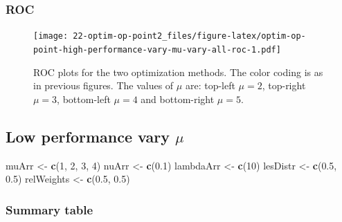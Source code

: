 \documentclass[
]{book}
\newenvironment{Shaded}{\begin{snugshade}}{\end{snugshade}}
\newcommand{\DecValTok}[1]{\textcolor[rgb]{0.00,0.00,0.81}{#1}}
\newcommand{\FloatTok}[1]{\textcolor[rgb]{0.00,0.00,0.81}{#1}}
\newcommand{\KeywordTok}[1]{\textcolor[rgb]{0.13,0.29,0.53}{\textbf{#1}}}
\newcommand{\NormalTok}[1]{#1}
\newcommand{\StringTok}[1]{\textcolor[rgb]{0.31,0.60,0.02}{#1}}
\begin{document}
\hypertarget{roc-5}{%
\subsubsection{ROC}\label{roc-5}}

\begin{figure}
\centering
\texttt{[image: 22-optim-op-point2\_files/figure-latex/optim-op-point-high-performance-vary-mu-vary-all-roc-1.pdf]}
\caption{\label{fig:optim-op-point-high-performance-vary-mu-vary-all-roc}ROC plots for the two optimization methods. The color coding is as in previous figures. The values of \(\mu\) are: top-left \(\mu = 2\), top-right \(\mu = 3\), bottom-left \(\mu = 4\) and bottom-right \(\mu = 5\).}
\end{figure}

\hypertarget{optim-op-point-low-performance-vary-mu}{%
\subsection{\texorpdfstring{Low performance vary \(\mu\)}{Low performance vary \textbackslash mu}}\label{optim-op-point-low-performance-vary-mu}}

\begin{Shaded}
\begin{Highlighting}[]
\NormalTok{muArr <-}\StringTok{ }\KeywordTok{c}\NormalTok{(}\DecValTok{1}\NormalTok{, }\DecValTok{2}\NormalTok{, }\DecValTok{3}\NormalTok{, }\DecValTok{4}\NormalTok{)}
\NormalTok{nuArr <-}\StringTok{ }\KeywordTok{c}\NormalTok{(}\FloatTok{0.1}\NormalTok{)}
\NormalTok{lambdaArr <-}\StringTok{ }\KeywordTok{c}\NormalTok{(}\DecValTok{10}\NormalTok{)}
\NormalTok{lesDistr <-}\StringTok{ }\KeywordTok{c}\NormalTok{(}\FloatTok{0.5}\NormalTok{, }\FloatTok{0.5}\NormalTok{)}
\NormalTok{relWeights <-}\StringTok{ }\KeywordTok{c}\NormalTok{(}\FloatTok{0.5}\NormalTok{, }\FloatTok{0.5}\NormalTok{)}
\end{Highlighting}
\end{Shaded}

\hypertarget{summary-table-5}{%
\subsubsection{Summary table}\label{summary-table-5}}
\end{document}
